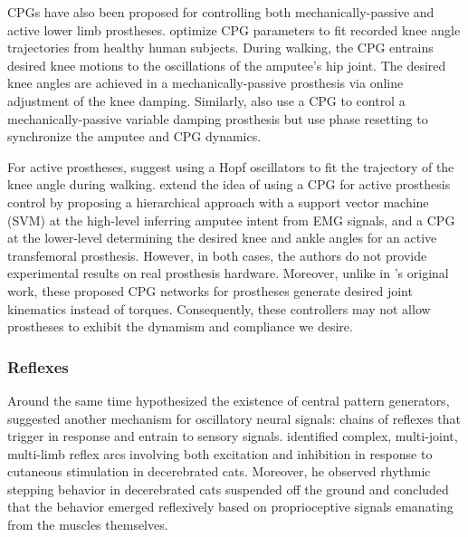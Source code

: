 CPGs have also been proposed for controlling both mechanically-passive and
active lower limb prostheses.  \citet{nandi2009development} optimize CPG
parameters to fit recorded knee angle trajectories from healthy human subjects.
During walking, the CPG entrains desired knee motions to the oscillations of the
amputee's hip joint. The desired knee angles are achieved in a
mechanically-passive prosthesis via online adjustment of the knee damping.
Similarly, \citet{torrealba2010through, mora2012cybernetic} also use a CPG to
control a mechanically-passive variable damping prosthesis but use phase
resetting to synchronize the amputee and CPG dynamics. 

For active prostheses, \citet{geng2012design} suggest using a Hopf oscillators
to fit the trajectory of the knee angle during walking. \citet{guo2010study}
extend the idea of using a CPG for active prosthesis control by proposing a
hierarchical approach with a support vector machine (SVM) at the high-level
inferring amputee intent from EMG signals, and a CPG at the lower-level
determining the desired knee and ankle angles for an active transfemoral
prosthesis. However, in both cases, the authors do not provide experimental
results on real prosthesis hardware. Moreover, unlike in
\citeauthor{taga1991self}'s original work, these proposed CPG networks for
prostheses generate desired joint kinematics instead of torques. Consequently,
these controllers may not allow prostheses to exhibit the dynamism and
compliance we desire.

\begin{comment}
There exists many models of CPGs of varying complexity: from sub-neural level
models that simulate how ion transport influences signal generation
\citep{hellgren1992computer, traven1993computer} to neuron level models that
investigate how the topology of neuron networks governs rhythmic activity
\citep{buchanan1992neural, williams1992phase}, to high-level models that examine
the role of interconnections between pools of neurons
\citep{matsuoka1987mechanisms, cohen1982nature}.
\citeauthor{matsuoka1987mechanisms}'s model is especially interesting as
\citet{taga1991self} uses this CPG architecture to achieve robust biped
locomotion in simulation. 
\end{comment}

\subsubsection{Reflexes}
Around the same time \citeauthor{brown1911intrinsic} hypothesized the existence
of central pattern generators, \citet{sherrington1910integrative,
sherrington1910flexion} suggested another mechanism for oscillatory neural
signals: chains of reflexes that trigger in response and entrain to sensory
signals. \citeauthor{sherrington1910integrative} identified complex,
multi-joint, multi-limb reflex arcs involving both excitation and inhibition in
response to cutaneous stimulation in decerebrated cats. Moreover, he observed
rhythmic stepping behavior in decerebrated cats suspended off the ground and
concluded that the behavior emerged reflexively based on proprioceptive signals
emanating from the muscles themselves.


